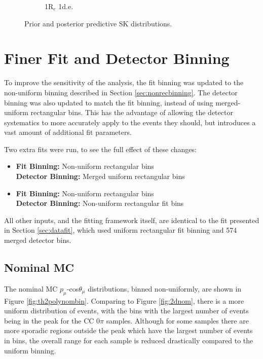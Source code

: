 \begin{figure}
\begin{subfigure}{.49\textwidth}
   \caption{1R$_{e}$ 1d.e.}
  \label{fig:skppnue1pi}
\end{subfigure}
\caption{Prior and posterior predictive SK distributions.}
\label{fig:skpp}
\end{figure}

\section{Finer Fit and Detector Binning}\label{sec:newbin}

To improve the sensitivity of the analysis, the fit binning was updated to the non-uniform binning described in Section \ref{sec:nonrecbinning}. The detector binning was also updated to match the fit binning, instead of using merged-uniform rectangular bins. This has the advantage of allowing the detector systematics to more accurately apply to the events they should, but introduces a vast amount of additional fit parameters.

Two extra fits were run, to see the full effect of these changes:

\begin{itemize}

\item \textbf{Fit Binning: } Non-uniform rectangular bins\\
\textbf{Detector Binning: } Merged uniform rectangular bins

\item \textbf{Fit Binning: } Non-uniform rectangular bins\\
\textbf{Detector Binning: } Non-uniform rectangular fit bins

\end{itemize}

All other inputs, and the fitting framework itself, are identical to the fit presented in Section \ref{sec:datafit}, which used uniform rectangular fit binning and 574 merged detector bins.

\subsection{Nominal MC}

The nominal MC $p_{\mu}$-cos$\theta_{\mu}$ distributions, binned non-uniformly, are shown in Figure \ref{fig:th2polynombin}. Comparing to Figure \ref{fig:2dnom}, there is a more uniform distribution of events, with the bins with the largest number of events being in the peak for the CC $0\pi$ samples. Although for some samples there are more sporadic regions outside the peak which have the largest number of events in bins, the overall range for each sample is reduced drastically compared to the uniform binning.

